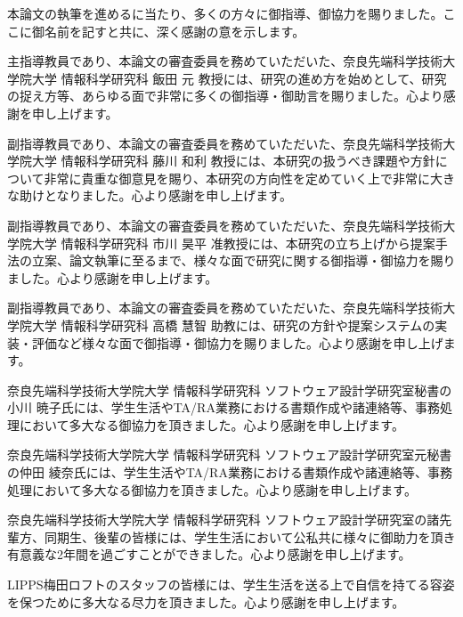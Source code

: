 本論文の執筆を進めるに当たり、多くの方々に御指導、御協力を賜りました。ここに御名前を記すと共に、深く感謝の意を示します。

主指導教員であり、本論文の審査委員を務めていただいた、奈良先端科学技術大学院大学 情報科学研究科 飯田 元 教授には、研究の進め方を始めとして、研究の捉え方等、あらゆる面で非常に多くの御指導・御助言を賜りました。心より感謝を申し上げます。

副指導教員であり、本論文の審査委員を務めていただいた、奈良先端科学技術大学院大学 情報科学研究科 藤川 和利 教授には、本研究の扱うべき課題や方針について非常に貴重な御意見を賜り、本研究の方向性を定めていく上で非常に大きな助けとなりました。心より感謝を申し上げます。

副指導教員であり、本論文の審査委員を務めていただいた、奈良先端科学技術大学院大学 情報科学研究科 市川 昊平 准教授には、本研究の立ち上げから提案手法の立案、論文執筆に至るまで、様々な面で研究に関する御指導・御協力を賜りました。心より感謝を申し上げます。

副指導教員であり、本論文の審査委員を務めていただいた、奈良先端科学技術大学院大学 情報科学研究科 高橋 慧智 助教には、研究の方針や提案システムの実装・評価など様々な面で御指導・御協力を賜りました。心より感謝を申し上げます。

奈良先端科学技術大学院大学 情報科学研究科 ソフトウェア設計学研究室秘書の小川 暁子氏には、学生生活やTA/RA業務における書類作成や諸連絡等、事務処理において多大なる御協力を頂きました。心より感謝を申し上げます。

奈良先端科学技術大学院大学 情報科学研究科 ソフトウェア設計学研究室元秘書の仲田 綾奈氏には、学生生活やTA/RA業務における書類作成や諸連絡等、事務処理において多大なる御協力を頂きました。心より感謝を申し上げます。

奈良先端科学技術大学院大学 情報科学研究科 ソフトウェア設計学研究室の諸先輩方、同期生、後輩の皆様には、学生生活において公私共に様々に御助力を頂き有意義な2年間を過ごすことができました。心より感謝を申し上げます。

LIPPS梅田ロフトのスタッフの皆様には、学生生活を送る上で自信を持てる容姿を保つために多大なる尽力を頂きました。心より感謝を申し上げます。